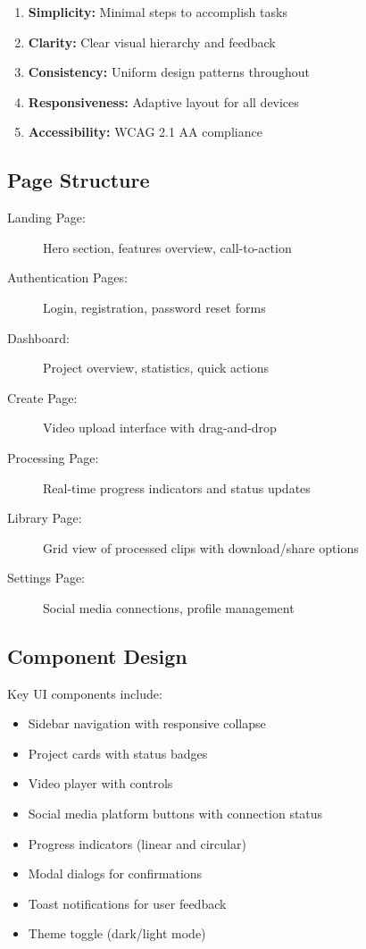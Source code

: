 \begin{enumerate}
    \item \textbf{Simplicity:} Minimal steps to accomplish tasks
    \item \textbf{Clarity:} Clear visual hierarchy and feedback
    \item \textbf{Consistency:} Uniform design patterns throughout
    \item \textbf{Responsiveness:} Adaptive layout for all devices
    \item \textbf{Accessibility:} WCAG 2.1 AA compliance
\end{enumerate}

\subsection{Page Structure}

\begin{description}
    \item[Landing Page:] Hero section, features overview, call-to-action
    \item[Authentication Pages:] Login, registration, password reset forms
    \item[Dashboard:] Project overview, statistics, quick actions
    \item[Create Page:] Video upload interface with drag-and-drop
    \item[Processing Page:] Real-time progress indicators and status updates
    \item[Library Page:] Grid view of processed clips with download/share options
    \item[Settings Page:] Social media connections, profile management
\end{description}

\subsection{Component Design}

Key UI components include:
\begin{itemize}
    \item Sidebar navigation with responsive collapse
    \item Project cards with status badges
    \item Video player with controls
    \item Social media platform buttons with connection status
    \item Progress indicators (linear and circular)
    \item Modal dialogs for confirmations
    \item Toast notifications for user feedback
    \item Theme toggle (dark/light mode)
\end{itemize}

